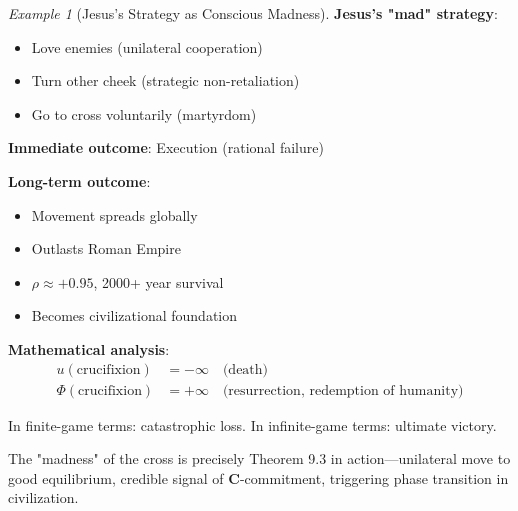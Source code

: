 \documentclass[11pt,a4paper]{article}
\theoremstyle{definition}
\theoremstyle{remark}
\newtheorem{example}{Example}[section]
\begin{document}
\begin{enumerate}
\begin{example}[Jesus's Strategy as Conscious Madness]
\textbf{Jesus's "mad" strategy}:
\begin{itemize}
    \item Love enemies (unilateral cooperation)
    \item Turn other cheek (strategic non-retaliation)
    \item Go to cross voluntarily (martyrdom)
\end{itemize}

\textbf{Immediate outcome}: Execution (rational failure)

\textbf{Long-term outcome}: 
\begin{itemize}
    \item Movement spreads globally
    \item Outlasts Roman Empire
    \item \(\rho \approx +0.95\), 2000+ year survival
    \item Becomes civilizational foundation
\end{itemize}

\textbf{Mathematical analysis}:
\begin{align}
u(\text{crucifixion}) &= -\infty \quad \text{(death)} \\
\Phi(\text{crucifixion}) &= +\infty \quad \text{(resurrection, redemption of humanity)}
\end{align}

In finite-game terms: catastrophic loss.
In infinite-game terms: ultimate victory.

The "madness" of the cross is precisely Theorem 9.3 in action—unilateral move to good equilibrium, credible signal of \(\mathbf{C}\)-commitment, triggering phase transition in civilization.
\end{example}

\begin{figure}[H]
\centering
{}
\end{figure}
\end{enumerate}
\end{document}

